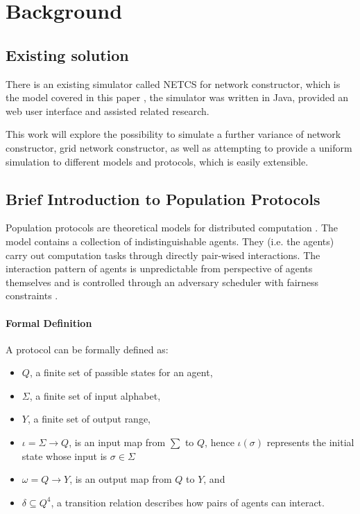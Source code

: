 \section{Background}

\subsection{Existing solution}
There is an existing simulator called NETCS \cite{DBLP:journals/corr/AmaxilatisLMS15} for network constructor, which is the model covered
in this paper \cite{MS16a}, the simulator was written in Java, provided an web user interface
and assisted related research.

\par\noindent
This work will explore the possibility to simulate a further variance of network constructor, grid network constructor, as well as attempting
to provide a uniform simulation to different models and protocols, which is easily extensible.


\subsection{Brief Introduction to Population Protocols \label{background} \cite{AspnesR2007, MCS11}}
\par\noindent
Population protocols are theoretical models for distributed computation \cite{AspnesR2007, MCS11}.
The model contains a collection of indistinguishable agents.
They (i.e. the agents) carry out computation tasks through directly pair-wised interactions.
The interaction pattern of agents is unpredictable from perspective of agents themselves
and is controlled through an adversary scheduler with fairness constraints \cite{AspnesR2007, MCS11}.
\paragraph{Formal Definition \cite{AspnesR2007}}
A protocol can be formally defined as:
\begin{itemize}
  \item $Q$, a finite set of passible states for an agent,
  \item $\Sigma$, a finite set of input alphabet,
  \item $Y$, a finite set of output range,
  \item $\iota = \Sigma \to Q $, is an input map from $\sum$ to $Q$, hence $\iota(\sigma)$ represents the initial state whose input is $\sigma \in \Sigma$
  \item $\omega = Q \to Y $, is an output map from $Q$ to $Y$, and
  \item $\delta \subseteq Q^{4}$, a transition relation describes how pairs of agents can interact.
\end{itemize}


